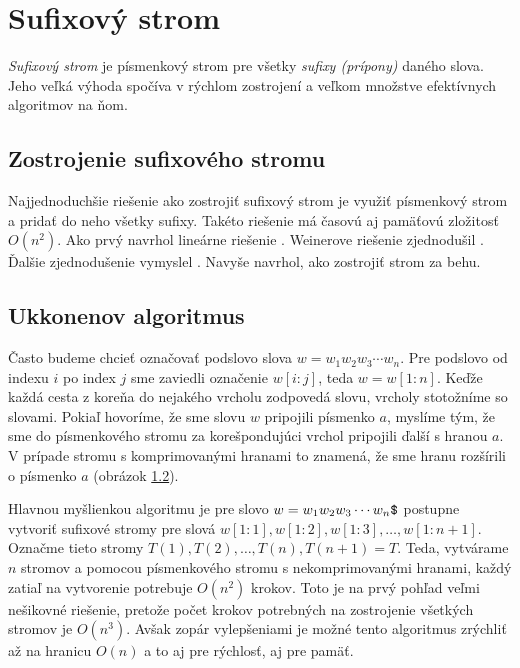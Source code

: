 \chapter{Sufixový strom}\label{chap:sx}

\emph{Sufixový strom} je písmenkový strom pre všetky \emph{sufixy (prípony)} 
daného slova. Jeho veľká výhoda spočíva v rýchlom zostrojení a veľkom množstve 
efektívnych algoritmov na ňom. 

\section{Zostrojenie sufixového stromu}
Najjednoduchšie riešenie ako zostrojiť sufixový strom
je využiť písmenkový strom a pridať do neho všetky sufixy. Takéto riešenie má 
časovú aj pamäťovú zložitosť $O(n^2)$. Ako prvý navrhol lineárne riešenie 
\citet{weiner}. Weinerove riešenie zjednodušil \citet{McCreight}. Ďalšie 
zjednodušenie vymyslel \citet{ukkonen}.
Navyše \citet{ukkonen} navrhol, ako zostrojiť strom za behu. 

\section{Ukkonenov algoritmus}

Často budeme chcieť označovať podslovo slova $w = w_1w_2w_3\cdots w_n$. 
Pre podslovo od indexu $i$ po index $j$ sme zaviedli označenie $w[i:j]$, teda 
$w = w[1:n]$. Keďže každá cesta z koreňa do nejakého vrcholu zodpovedá slovu, 
vrcholy stotožníme so slovami. Pokiaľ hovoríme, že sme slovu $w$ 
pripojili písmenko $a$, myslíme tým, že sme do písmenkového stromu za 
korešpondujúci vrchol pripojili ďalší s hranou $a$. V prípade stromu s 
komprimovanými hranami to znamená, že sme hranu rozšírili o písmenko $a$ 
(obrázok \ref{}).

Hlavnou myšlienkou algoritmu je pre slovo $w = w_1w_2w_3\cdots w_n\hbox{\tt\$}$ 
postupne vytvoriť sufixové stromy pre slová $w[1:1], w[1:2], w[1:3], \ldots, 
w[1:n+1]$. Označme tieto stromy $T(1), T(2),\ldots, T(n), T(n+1) = T$. 
Teda, vytvárame $n$ stromov a pomocou písmenkového stromu s nekomprimovanými 
hranami, každý zatiaľ na vytvorenie potrebuje $O(n^2)$ 
krokov. Toto je na prvý pohľad veľmi nešikovné riešenie, pretože počet 
krokov potrebných na zostrojenie všetkých stromov je $O(n^3)$. 
Avšak zopár vylepšeniami je možné tento algoritmus zrýchliť až na hranicu 
$O(n)$ a to aj pre rýchlosť, aj pre pamäť. 

